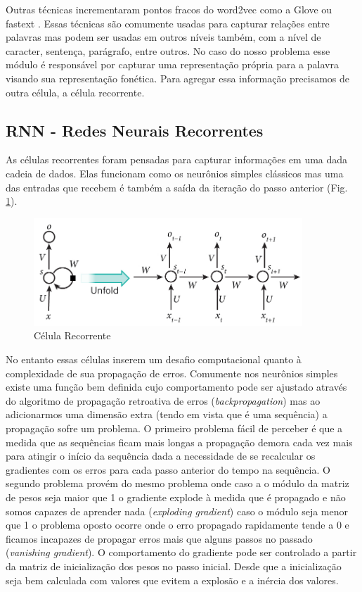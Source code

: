 Outras técnicas incrementaram pontos fracos do word2vec como a Glove \cite{glove:pennington2014glove} ou fastext \cite{fasttext:joulin2016fasttextzip}. Essas técnicas são comumente usadas para capturar relações entre palavras mas podem ser usadas em outros níveis também, com a nível de caracter, sentença, parágrafo, entre outros. No caso do nosso problema esse módulo é responsável por capturar uma representação própria para a palavra visando sua representação fonética. Para agregar essa informação precisamos de outra célula, a célula recorrente.

\subsection{RNN - Redes Neurais Recorrentes}
As células recorrentes foram pensadas para capturar informações em uma dada cadeia de dados. Elas funcionam como os neurônios simples clássicos mas uma das entradas que recebem é também a saída da iteração do passo anterior (Fig. \ref{fig:rnn}).

\begin{figure}[h]
    \centering
    \includegraphics[width=0.9\textwidth]{figuras/rnn.jpg}
    \caption{Célula Recorrente}
    \label{fig:rnn}
\end{figure}

No entanto essas células inserem um desafio computacional quanto à complexidade de sua propagação de erros. Comumente nos neurônios simples existe uma função bem definida cujo comportamento pode ser ajustado através do algoritmo de propagação retroativa de erros (\textit{backpropagation}) mas ao adicionarmos uma dimensão extra (tendo em vista que é uma sequência) a propagação sofre um problema. O primeiro problema fácil de perceber é que a medida que as sequências ficam mais longas a propagação demora cada vez mais para atingir o início da sequência dada a necessidade de se recalcular os gradientes com os erros para cada passo anterior do tempo na sequência. O segundo problema provém do mesmo problema onde caso a o módulo da matriz de pesos seja maior que 1 o gradiente explode à medida que é propagado e não somos capazes de aprender nada (\textit{exploding gradient}) caso o módulo seja menor que 1 o problema oposto ocorre onde o erro propagado rapidamente tende a 0 e ficamos incapazes de propagar erros mais que alguns passos no passado (\textit{vanishing gradient}). O comportamento do gradiente pode ser controlado a partir da matriz de inicialização dos pesos no passo inicial. Desde que a inicialização seja bem calculada com valores que evitem a explosão e a inércia dos valores. \cite{exploding_gradient}

